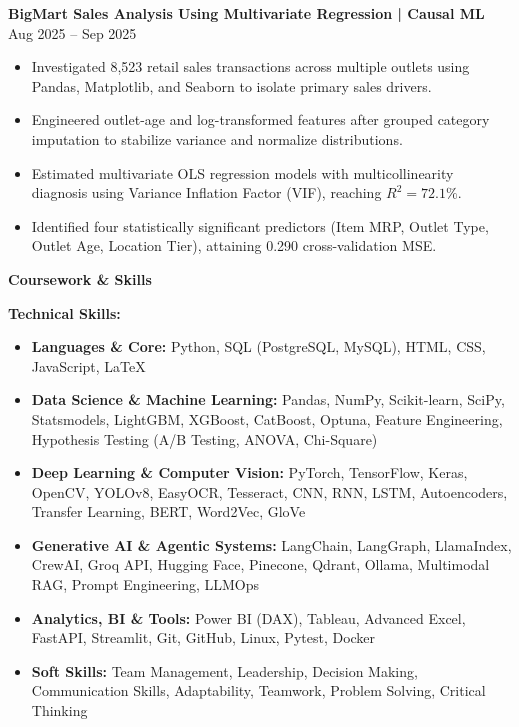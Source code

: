 \documentclass[10pt]{article}
\begin{document}
\vspace{8pt}

\textbf{BigMart Sales Analysis Using Multivariate Regression | Causal ML} \hfill Aug 2025 -- Sep 2025
\begin{itemize}[noitemsep, topsep=2pt, partopsep=0pt, parsep=1.5pt]
    \item Investigated 8,523 retail sales transactions across multiple outlets using Pandas, Matplotlib, and Seaborn to isolate primary sales drivers.
    \item Engineered outlet-age and log-transformed features after grouped category imputation to stabilize variance and normalize distributions.
    \item Estimated multivariate OLS regression models with multicollinearity diagnosis using Variance Inflation Factor (VIF), reaching $R^2 = 72.1\%$.
    \item Identified four statistically significant predictors (Item MRP, Outlet Type, Outlet Age, Location Tier), attaining 0.290 cross-validation MSE.
\end{itemize}

\newpage

\begin{center}
    \textbf{Coursework \& Skills}
\end{center}
\vspace{-4pt}

\textbf{Technical Skills:}
\begin{itemize}[noitemsep, topsep=1.5pt, partopsep=0pt, parsep=1pt]
    \item \textbf{Languages \& Core:} Python, SQL (PostgreSQL, MySQL), HTML, CSS, JavaScript, LaTeX
    \item \textbf{Data Science \& Machine Learning:} Pandas, NumPy, Scikit-learn, SciPy, Statsmodels, LightGBM, XGBoost, CatBoost, Optuna, Feature Engineering, Hypothesis Testing (A/B Testing, ANOVA, Chi-Square)
    \item \textbf{Deep Learning \& Computer Vision:} PyTorch, TensorFlow, Keras, OpenCV, YOLOv8, EasyOCR, Tesseract, CNN, RNN, LSTM, Autoencoders, Transfer Learning, BERT, Word2Vec, GloVe
    \item \textbf{Generative AI \& Agentic Systems:} LangChain, LangGraph, LlamaIndex, CrewAI, Groq API, Hugging Face, Pinecone, Qdrant, Ollama, Multimodal RAG, Prompt Engineering, LLMOps
    \item \textbf{Analytics, BI \& Tools:} Power BI (DAX), Tableau, Advanced Excel, FastAPI, Streamlit, Git, GitHub, Linux, Pytest, Docker
    \item \textbf{Soft Skills:} Team Management, Leadership, Decision Making, Communication Skills, Adaptability, Teamwork, Problem Solving, Critical Thinking
\end{itemize}
\end{document}
